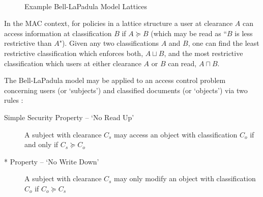 \begin{figure}[h!]
	\centering
	\begin{subfigure}[t]{0.2\textwidth}
		\caption{}
	\end{subfigure}
	~
	\begin{subfigure}[t]{0.1\textwidth}
		\caption{}
	\end{subfigure}
	\caption{Example Bell-LaPadula Model Lattices}
	\label{fig:theory_lattice_diagrams}
\end{figure}



In the MAC context, for policies in a lattice structure a user at clearance $ A $ can access information at classification $ B $ if $ A \succeq B $ (which may be read as ``$ B $ is less restrictive than $ A $"). Given any two classifications $ A $ and $ B $, one can find the least restrictive classification which enforces both, $ A \sqcup B $, and the most restrictive classification which users at either clearance $ A $ or $ B $ can read, $ A \sqcap B $.

The Bell-LaPadula model may be applied to an access control problem concerning users (or `subjects') and classified documents (or `objects') via two rules \cite{sandhu1993lattice}:

\begin{description}
	\item[Simple Security Property -- `No Read Up'] A subject with clearance $ C_s $ may access an object with classification $ C_o $ if and only if $ C_s \succeq C_o $
	
	\item[* Property -- `No Write Down'] A subject with clearance $ C_s $ may only modify an object with classification $ C_o $ if $ C_o \succeq C_s $
\end{description}


